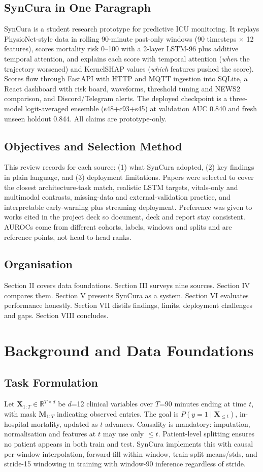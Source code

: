 \documentclass[a4paper,conference]{IEEEtran}
\begin{document}
\subsection{SynCura in One Paragraph}
SynCura is a student research prototype for predictive ICU monitoring. It replays PhysioNet-style data in rolling 90-minute past-only windows (90 timesteps $\times$ 12 features), scores mortality risk 0--100 with a 2-layer LSTM-96 plus additive temporal attention, and explains each score with temporal attention ({\em when} the trajectory worsened) and KernelSHAP values ({\em which} features pushed the score). Scores flow through FastAPI with HTTP and MQTT ingestion into SQLite, a React dashboard with risk board, waveforms, threshold tuning and NEWS2 comparison, and Discord/Telegram alerts. The deployed checkpoint is a three-model logit-averaged ensemble (s48+c93+s45) at validation AUC 0.840 and fresh unseen holdout 0.844. All claims are prototype-only.

\subsection{Objectives and Selection Method}
This review records for each source: (1) what SynCura adopted, (2) key findings in plain language, and (3) deployment limitations. Papers were selected to cover the closest architecture-task match, realistic LSTM targets, vitals-only and multimodal contrasts, missing-data and external-validation practice, and interpretable early-warning plus streaming deployment. Preference was given to works cited in the project deck so document, deck and report stay consistent. AUROCs come from different cohorts, labels, windows and splits and are reference points, not head-to-head ranks.

\subsection{Organisation}
Section II covers data foundations. Section III surveys nine sources. Section IV compares them. Section V presents SynCura as a system. Section VI evaluates performance honestly. Section VII distils findings, limits, deployment challenges and gaps. Section VIII concludes.

\section{Background and Data Foundations}
\subsection{Task Formulation}
Let $\mathbf{X}_{1:T} \in \mathbb{R}^{T \times d}$ be $d$=12 clinical variables over $T$=90 minutes ending at time $t$, with mask $\mathbf{M}_{1:T}$ indicating observed entries. The goal is $P(y=1 \mid \mathbf{X}_{\le t})$, in-hospital mortality, updated as $t$ advances. Causality is mandatory: imputation, normalisation and features at $t$ may use only $\le t$. Patient-level splitting ensures no patient appears in both train and test. SynCura implements this with causal per-window interpolation, forward-fill within window, train-split means/stds, and stride-15 windowing in training with window-90 inference regardless of stride.
\end{document}
